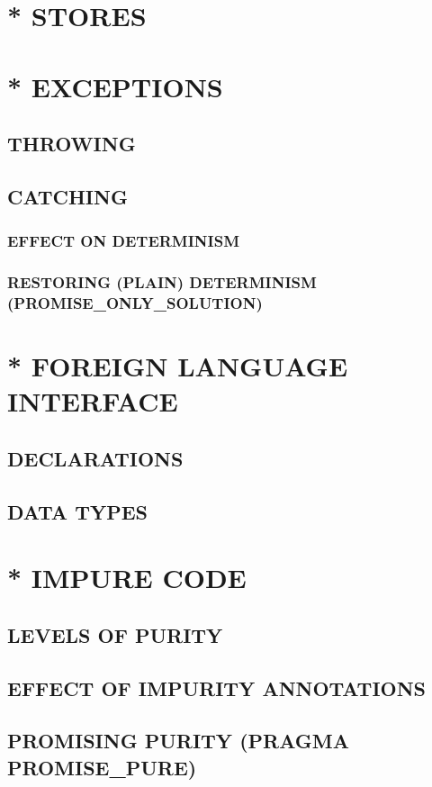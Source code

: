 \documentclass[a4paper,11pt,notitlepage,onecolumn]{article}
\begin{document}
\section{* STORES}



\section{* EXCEPTIONS}
\subsection{THROWING}
\subsection{CATCHING}
\subsubsection{EFFECT ON DETERMINISM}
\subsubsection{RESTORING (PLAIN) DETERMINISM (PROMISE\_ONLY\_SOLUTION)}



\section{* FOREIGN LANGUAGE INTERFACE}
\subsection{DECLARATIONS}
\subsection{DATA TYPES}



\section{* IMPURE CODE}
\subsection{LEVELS OF PURITY}
\subsection{EFFECT OF IMPURITY ANNOTATIONS}
\subsection{PROMISING PURITY (PRAGMA PROMISE\_PURE)}
\end{document}
